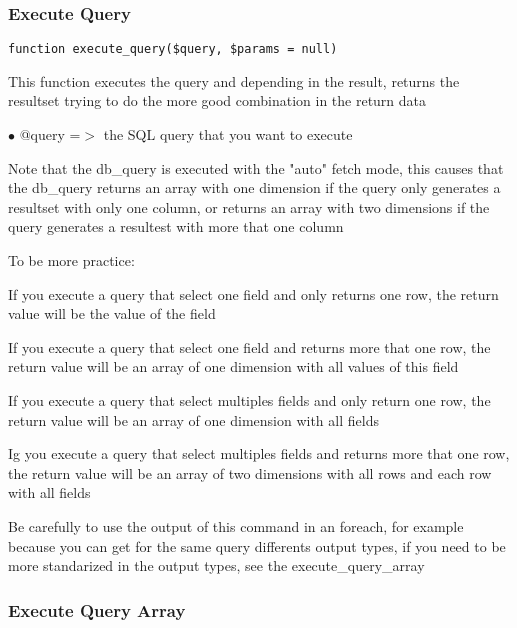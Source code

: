 \documentclass[a4paper]{article}
\begin{document}
\hypertarget{toc217}{}
\subsubsection{Execute Query}

\begin{lstlisting}
function execute_query($query, $params = null)
\end{lstlisting}

This function executes the query and depending in the result, returns the
resultset trying to do the more good combination in the return data

\begin{compactitem}
\item[\color{myblue}$\bullet$] @query =$>$ the SQL query that you want to execute
\end{compactitem}

Note that the db\_query is executed with the "auto" fetch mode, this causes
that the db\_query returns an array with one dimension if the query only
generates a resultset with only one column, or returns an array with two
dimensions if the query generates a resultest with more that one column

To be more practice:

If you execute a query that select one field and only returns one row,
the return value will be the value of the field

If you execute a query that select one field and returns more that one
row, the return value will be an array of one dimension with all values
of this field

If you execute a query that select multiples fields and only return one
row, the return value will be an array of one dimension with all fields

Ig you execute a query that select multiples fields and returns more that
one row, the return value will be an array of two dimensions with all rows
and each row with all fields

Be carefully to use the output of this command in an foreach, for example
because you can get for the same query differents output types, if you
need to be more standarized in the output types, see the execute\_query\_array

\hypertarget{toc218}{}
\subsubsection{Execute Query Array}
\end{document}

